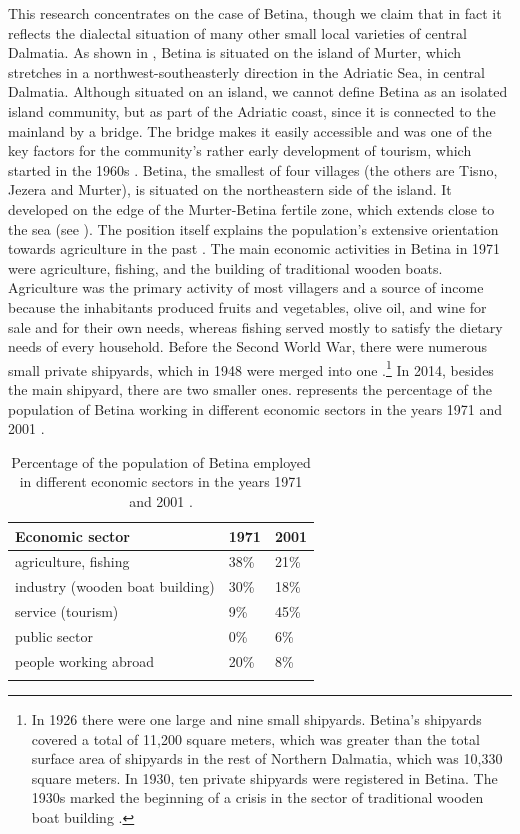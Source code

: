 \documentclass[output=paper]{LSP/langsci}
\begin{document}
This research concentrates on the case of Betina, though we claim that in fact it reflects the dialectal situation of many other small local varieties of central Dalmatia. As shown in , Betina is situated on the island of Murter, which stretches in a northwest-southeasterly direction in the Adriatic Sea, in central Dalmatia. Although situated on an island, we cannot define Betina as an isolated island community, but as part of the Adriatic coast, since it is connected to the mainland by a bridge. The bridge makes it easily accessible and was one of the key factors for the community’s rather early development of tourism, which started in the 1960s \citep[138]{kulusic_murterski_1984}. Betina, the smallest of four villages (the others are Tisno, Jezera and Murter), is situated on the northeastern side of the island. It developed on the edge of the Murter-Betina fertile zone, which extends close to the sea (see ). The position itself explains the population's extensive orientation towards agriculture in the past \citep[12]{skracic_otok_2010}. The main economic activities in Betina in 1971 were agriculture, fishing, and the building of traditional wooden boats. Agriculture was the primary activity of most villagers and a source of income because the inhabitants produced fruits and vegetables, olive oil, and wine for sale and for their own needs, whereas fishing served mostly to satisfy the dietary needs of every household. Before the Second World War, there were numerous small private shipyards, which in 1948 were merged into one \citep[21]{filipi_betinska_1997}.\footnote{In 1926 there were one large and nine small shipyards. Betina’s shipyards covered a total of 11,200 square meters, which was greater than the total surface area of shipyards in the rest of Northern Dalmatia, which was 10,330 square meters. In 1930, ten private shipyards were registered in Betina. The 1930s marked the beginning of a crisis in the sector of traditional wooden boat building \citep[19]{filipi_betinska_1997}.} In 2014, besides the main shipyard, there are two smaller ones.  represents the percentage of the population of Betina working in different economic sectors in the years 1971 and 2001 \citep[21]{skracic_otok_2010}.

\begin{table}
\begin{tabular}{lll} 
\lsptoprule
Economic sector & 1971 & 2001\\
\midrule
agriculture, fishing & 38\% & 21\%\\
industry (wooden boat building) & 30\% & 18\%\\
service (tourism) & 9\% & 45\%\\
public sector & 0\% & 6\%\\
people working abroad & 20\% & 8\%\\
\lspbottomrule
\end{tabular}
\caption{Percentage of the population of Betina employed in different economic sectors in the years 1971 and 2001 \citep{skracic_otok_2010}.}
\label{tab:skevin:1}
\end{table}
\end{document}
